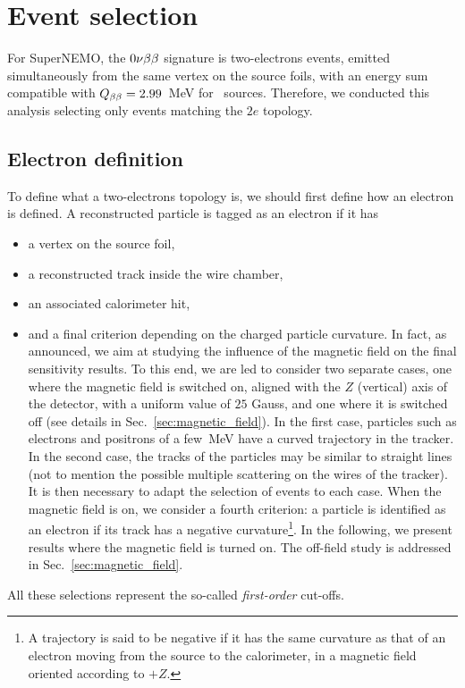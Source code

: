 \section{Event selection}
\label{sec:sensitivity_ev_selection}

For SuperNEMO, the $0\nu\beta\beta$ signature is two-electrons events, emitted simultaneously from the same vertex on the source foils, with an energy sum compatible with $Q_{\beta\beta} = 2.99$~MeV for \Se\ sources.
Therefore, we conducted this analysis selecting only events matching the $2e$ topology.

\subsection{Electron definition}

To define what a two-electrons topology is, we should first define how an electron is defined.
A reconstructed particle is tagged as an electron if it has
\begin{itemize}
\item a vertex on the source foil,
\item a reconstructed track inside the wire chamber,
\item an associated calorimeter hit,
\item and a final criterion depending on the charged particle curvature.
  In fact, as announced, we aim at studying the influence of the magnetic field on the final sensitivity results.
  To this end, we are led to consider two separate cases, one where the magnetic field is switched on, aligned with the $Z$ (vertical) axis of the detector, with a uniform value of $25$ Gauss, and one where it is switched off (see details in Sec.~\ref{sec:magnetic_field}).
  In the first case, particles such as electrons and positrons of a few~MeV have a curved trajectory in the tracker.
  In the second case, the tracks of the particles may be similar to straight lines (not to mention the possible multiple scattering on the wires of the tracker).
  It is then necessary to adapt the selection of events to each case.
  When the magnetic field is on, we consider a fourth criterion: a particle is identified as an electron if its track has a negative curvature\footnote{A trajectory is said to be negative if it has the same curvature as that of an electron moving from the source to the calorimeter, in a magnetic field oriented according to $+Z$.}.
  In the following, we present results where the magnetic field is turned on.
  The off-field study is addressed in Sec.~\ref{sec:magnetic_field}.
\end{itemize}
All these selections represent the so-called \emph{first-order} cut-offs.


